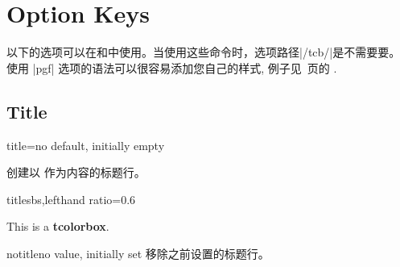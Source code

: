 \section{Option Keys}\label{sec:optkeys}%
%

以下的选项可以在和中使用。当使用这些命令时，选项路径|/tcb/|是不需要要。
使用 |pgf| 选项的语法可以很容易添加您自己的样式, 例子见~\pageref{sec:latextutorial}页的 \cite{tantau:tikz_and_pgf,sturm:latex} .

\subsection{Title}
\begin{docTcbKey}{title}{=}{no default, initially empty}

创建以  作为内容的标题行。

\begin{exdispExample*}{title}{sbs,lefthand ratio=0.6}
\begin{tcolorbox}[title=My heading line]
This is a \textbf{tcolorbox}.
\end{tcolorbox}
\end{exdispExample*}
\end{docTcbKey}

\begin{docTcbKey}{notitle}{}{no value, initially set}
移除之前设置的标题行。
\end{docTcbKey}



